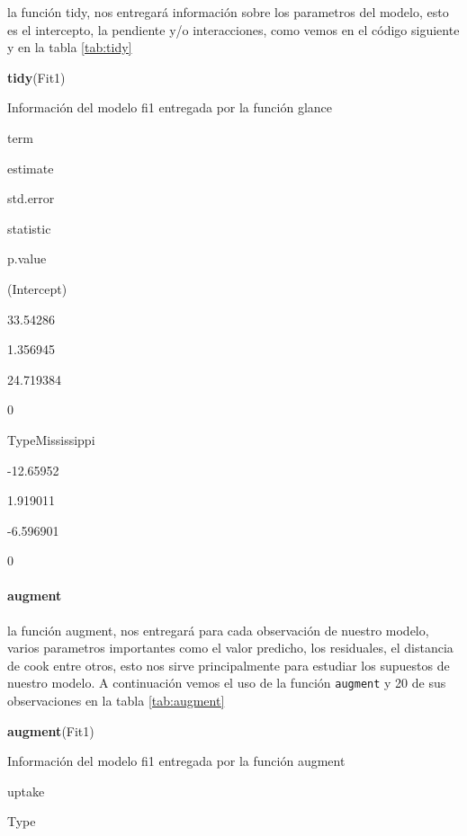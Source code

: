 \documentclass[]{book}
\newenvironment{Shaded}{\begin{snugshade}}{\end{snugshade}}
\newcommand{\KeywordTok}[1]{\textcolor[rgb]{0.13,0.29,0.53}{\textbf{#1}}}
\newcommand{\NormalTok}[1]{#1}
\let\oldparagraph\paragraph
\renewcommand{\paragraph}[1]{\oldparagraph{#1}\mbox{}}
\begin{document}
la función tidy, nos entregará información sobre los parametros del
modelo, esto es el intercepto, la pendiente y/o interacciones, como
vemos en el código siguiente y en la tabla \ref{tab:tidy}

\begin{Shaded}
\begin{Highlighting}[]
\KeywordTok{tidy}\NormalTok{(Fit1)}
\end{Highlighting}
\end{Shaded}

\label{tab:tidy}Información del modelo fi1 entregada por la función glance

term

estimate

std.error

statistic

p.value

(Intercept)

33.54286

1.356945

24.719384

0

TypeMississippi

-12.65952

1.919011

-6.596901

0

\hypertarget{augment}{%
\paragraph{augment}\label{augment}}

la función augment, nos entregará para cada observación de nuestro
modelo, varios parametros importantes como el valor predicho, los
residuales, el distancia de cook entre otros, esto nos sirve
principalmente para estudiar los supuestos de nuestro modelo. A
continuación vemos el uso de la función \texttt{augment} y 20 de sus
observaciones en la tabla \ref{tab:augment}

\begin{Shaded}
\begin{Highlighting}[]
\KeywordTok{augment}\NormalTok{(Fit1)}
\end{Highlighting}
\end{Shaded}

\label{tab:augment}Información del modelo fi1 entregada por la función
augment

uptake

Type
\end{document}
